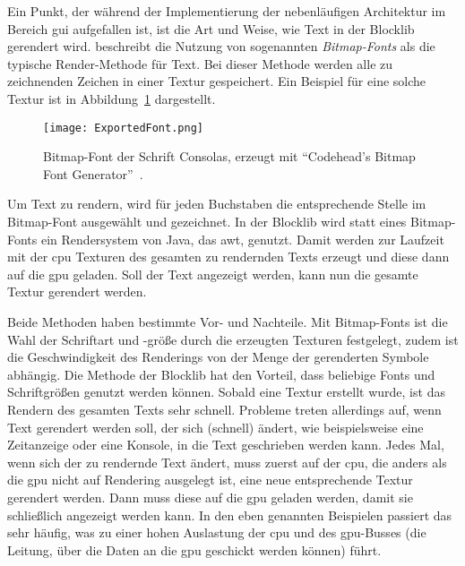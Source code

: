 Ein Punkt, der während der Implementierung der nebenläufigen Architektur im Bereich \ac{gui} aufgefallen ist, ist die Art und Weise, wie Text in der Blocklib gerendert wird. \textcite{Vries2020} beschreibt die Nutzung von sogenannten \emph{Bitmap-Fonts} als die typische Render-Methode für Text. Bei dieser Methode werden alle zu zeichnenden Zeichen in einer Textur gespeichert. Ein Beispiel für eine solche Textur ist in Abbildung~\ref{fig:bitmapfont} dargestellt.
\begin{figure}[!htbp]
	\centering
	\texttt{[image: ExportedFont.png]}
	\caption[Bitmap-Font der Schrift Consolas.]{Bitmap-Font der Schrift Consolas, erzeugt mit \enquote{Codehead's Bitmap Font Generator}~\cite{Codehead2015}.}\label{fig:bitmapfont}
\end{figure}
Um Text zu rendern, wird für jeden Buchstaben die entsprechende Stelle im Bitmap-Font ausgewählt und gezeichnet. In der Blocklib wird statt eines Bitmap-Fonts ein Rendersystem von Java, das \ac{awt}, genutzt. Damit werden zur Laufzeit mit der \ac{cpu} Texturen des gesamten zu rendernden Texts erzeugt und diese dann auf die \ac{gpu} geladen. Soll der Text angezeigt werden, kann nun die gesamte Textur gerendert werden.

Beide Methoden haben bestimmte Vor- und Nachteile. Mit Bitmap-Fonts ist die Wahl der Schriftart und -größe durch die erzeugten Texturen festgelegt, zudem ist die Geschwindigkeit des Renderings von der Menge der gerenderten Symbole abhängig. Die Methode der Blocklib hat den Vorteil, dass beliebige Fonts und Schriftgrößen genutzt werden können. Sobald eine Textur erstellt wurde, ist das Rendern des gesamten Texts sehr schnell. Probleme treten allerdings auf, wenn Text gerendert werden soll, der sich (schnell) ändert, wie beispielsweise eine Zeitanzeige oder eine Konsole, in die Text geschrieben werden kann. Jedes Mal, wenn sich der zu rendernde Text ändert, muss zuerst auf der \ac{cpu}, die anders als die \ac{gpu} nicht auf Rendering ausgelegt ist, eine neue entsprechende Textur gerendert werden. Dann muss diese auf die \ac{gpu} geladen werden, damit sie schließlich angezeigt werden kann. In den eben genannten Beispielen passiert das sehr häufig, was zu einer hohen Auslastung der \ac{cpu} und des \ac{gpu}-Busses (die Leitung, über die Daten an die \ac{gpu} geschickt werden können) führt.

